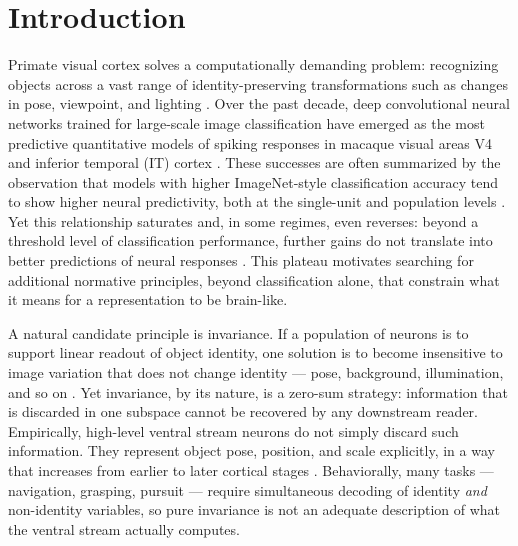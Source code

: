
\section*{Introduction}

Primate visual cortex solves a computationally demanding problem: recognizing objects across a vast range of identity-preserving transformations such as changes in pose, viewpoint, and lighting \cite{dicarlo2007untangling,dicarlo2012how}. Over the past decade, deep convolutional neural networks trained for large-scale image classification have emerged as the most predictive quantitative models of spiking responses in macaque visual areas V4 and inferior temporal (IT) cortex \cite{yamins2014performance,khalighrazavi2014deep,yamins2016using}. These successes are often summarized by the observation that models with higher ImageNet-style classification accuracy tend to show higher neural predictivity, both at the single-unit and population levels \cite{yamins2014performance,majaj2015simple,schrimpf2020integrative}. Yet this relationship saturates and, in some regimes, even reverses: beyond a threshold level of classification performance, further gains do not translate into better predictions of neural responses \cite{schrimpf2020integrative}. This plateau motivates searching for additional normative principles, beyond classification alone, that constrain what it means for a representation to be brain-like.

A natural candidate principle is invariance. If a population of neurons is to support linear readout of object identity, one solution is to become insensitive to image variation that does not change identity --- pose, background, illumination, and so on \cite{dicarlo2007untangling}. Yet invariance, by its nature, is a zero-sum strategy: information that is discarded in one subspace cannot be recovered by any downstream reader. Empirically, high-level ventral stream neurons do not simply discard such information. They represent object pose, position, and scale explicitly, in a way that increases from earlier to later cortical stages \cite{hong2016explicit,rust2012balanced,freiwald2010functional}. Behaviorally, many tasks --- navigation, grasping, pursuit --- require simultaneous decoding of identity \emph{and} non-identity variables, so pure invariance is not an adequate description of what the ventral stream actually computes.

